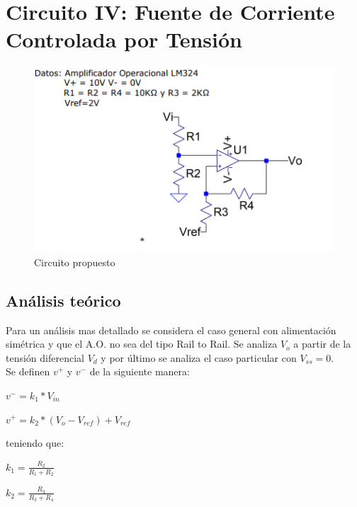 \documentclass[11pt, a4paper]{article}
\begin{document}
\section{Circuito IV: Fuente de Corriente Controlada por Tensión}
\begin{figure}[htb]
	\centering
	\includegraphics[width=1\textwidth]{Imagenes/circuito4.png}
	\caption{Circuito propuesto}
\end{figure}
\subsection{Análisis teórico}
Para un análisis mas detallado se considera el caso general con alimentación simétrica y que el A.O. no sea del tipo Rail to Rail. Se analiza $V_o$ a partir de la tensión diferencial $V_d$ y por último se analiza el caso particular con $V_{ss}=0$.\\
Se definen $v^+$ y $v^-$ de la siguiente manera:
\begin{center}
	$v^- = k_1 * V_{in}$
\end{center}
\begin{center}
	$v^+ = k_2 * (V_o - V_{ref})+V_{ref}$
\end{center}
teniendo que:
\begin{center}
	$k_1 = \frac{R_2}{R_1 + R_2}$
\end{center}
\begin{center}
	$k_2 = \frac{R_3}{R_3 + R_4}$
\end{center}
\end{document}
